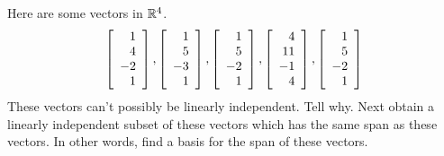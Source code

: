 \begin{enumialphparenastyle}
\begin{ex} Here are some vectors in $\mathbb{R}^{4}$. 
\begin{equation*}
\left[ 
\begin{array}{r}
1 \\ 
4 \\ 
-2 \\ 
1
\end{array}
\right] ,\left[ 
\begin{array}{r}
1 \\ 
5 \\ 
-3 \\ 
1
\end{array}
\right] ,\left[ 
\begin{array}{r}
1 \\ 
5 \\ 
-2 \\ 
1
\end{array}
\right] ,\left[ 
\begin{array}{r}
4 \\ 
11 \\ 
-1 \\ 
4
\end{array}
\right] ,\left[ 
\begin{array}{r}
1 \\ 
5 \\ 
-2 \\ 
1
\end{array}
\right] 
\end{equation*}
These vectors can't possibly be linearly independent. Tell why. Next obtain a
linearly independent subset of these vectors which has the same span as
these vectors. In other words, find a basis for the span of these vectors.
\end{ex}


\end{enumialphparenastyle}
